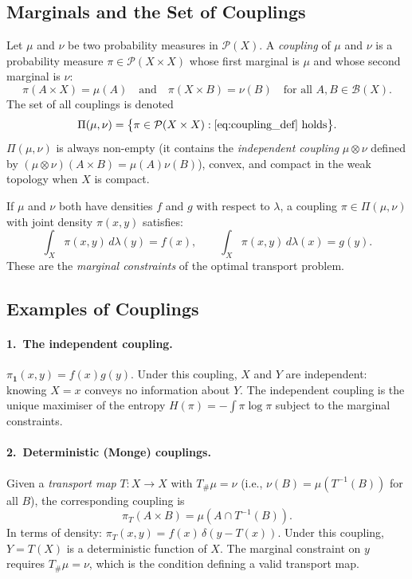 \documentclass[12pt]{article}
\newcommand{\calP}{\mathcal{P}}
\newcommand{\ind}{\mathbf{1}}
\begin{document}
\subsection{Marginals and the Set of Couplings}

Let $\mu$ and $\nu$ be two probability measures in $\calP(X)$.
A \emph{coupling} of $\mu$ and $\nu$ is a probability measure
$\pi \in \calP(X \times X)$ whose first marginal is $\mu$ and
whose second marginal is $\nu$:
\begin{equation}\label{eq:coupling_def}
  \pi(A \times X) = \mu(A)
  \quad\text{and}\quad
  \pi(X \times B) = \nu(B)
  \quad \text{for all } A, B \in \mathcal{B}(X).
\end{equation}
The set of all couplings is denoted
\begin{equation}
  \Pi(\mu,\nu) = \bigl\{\pi \in \calP(X\times X) :
    \text{\eqref{eq:coupling_def} holds}\bigr\}.
\end{equation}
$\Pi(\mu,\nu)$ is always non-empty (it contains the
\emph{independent coupling} $\mu \otimes \nu$ defined by
$(\mu\otimes\nu)(A\times B) = \mu(A)\nu(B)$), convex, and
compact in the weak topology when $X$ is compact.

If $\mu$ and $\nu$ both have densities $f$ and $g$ with respect
to $\lambda$, a coupling $\pi \in \Pi(\mu,\nu)$ with
joint density $\pi(x,y)$ satisfies:
\begin{equation}\label{eq:marginal_constraints}
  \int_X \pi(x,y)\,d\lambda(y) = f(x),
  \qquad
  \int_X \pi(x,y)\,d\lambda(x) = g(y).
\end{equation}
These are the \emph{marginal constraints} of the optimal
transport problem.

\subsection{Examples of Couplings}

\paragraph{1.~The independent coupling.}
$\pi_\ind(x,y) = f(x)g(y)$.  Under this coupling, $X$ and $Y$
are independent: knowing $X = x$ conveys no information about
$Y$.  The independent coupling is the unique maximiser of the
entropy $H(\pi) = -\int\pi\log\pi$ subject to the marginal
constraints.

\paragraph{2.~Deterministic (Monge) couplings.}
Given a \emph{transport map} $T: X \to X$ with $T_\#\mu = \nu$
(i.e., $\nu(B) = \mu(T^{-1}(B))$ for all $B$), the
corresponding coupling is
\begin{equation}\label{eq:monge_coupling}
  \pi_T(A \times B) = \mu(A \cap T^{-1}(B)).
\end{equation}
In terms of density: $\pi_T(x,y) = f(x)\,\delta(y - T(x))$.
Under this coupling, $Y = T(X)$ is a deterministic function of
$X$.  The marginal constraint on $y$ requires $T_\#\mu = \nu$,
which is the condition defining a valid transport map.
\end{document}
